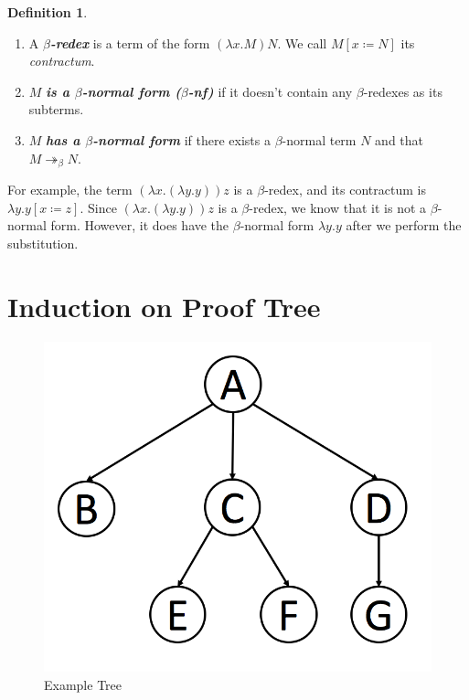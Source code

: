 \documentclass[a4paper,11pt]{article}
\theoremstyle{definition}
\newtheorem{definition}{Definition}[section]
\theoremstyle{example}
\theoremstyle{lemma}
\newcommand{\lamterm}[2]{\lambda #1. #2}
\newcommand{\subs}[3]{#1[#2\coloneqq#3]}
\newcommand{\msbr}{\twoheadrightarrow_{\beta}}
\begin{document}
\begin{definition}\ 
\begin{enumerate}[topsep=2pt,itemsep=-0.5ex,partopsep=1ex,parsep=1ex]
    \item A \textbf{\textit{$\beta$-redex}} is a term of the form $(\lamterm{x}{M})N$. We call $\subs{M}{x}{N}$ its \textit{contractum}. 
    \item $M$ \textit{\textbf{is a $\beta$-normal form ($\beta$-nf)}} if it doesn't contain any $\beta$-redexes as its subterms.
    \item $M$ \textit{\textbf{has a $\beta$-normal form}} if there exists a $\beta$-normal term $N$ and that $M \msbr N$.
\end{enumerate}
For example, the term $(\lamterm{x}{(\lamterm{y}{y})})z$ is a $\beta$-redex, and its contractum is $\subs{\lamterm{y}{y}}{x}{z}$. Since $(\lamterm{x}{(\lamterm{y}{y})})z$ is a $\beta$-redex, we know that it is not a $\beta$-normal form. However, it does have the $\beta$-normal form $\lamterm{y}{y}$ after we perform the substitution.

\end{definition}

\section{Induction on Proof Tree}

\begin{figure}
  \includegraphics[scale=0.35]{tree_example.png}
  \caption{Example Tree}
\end{figure}
\end{document}
